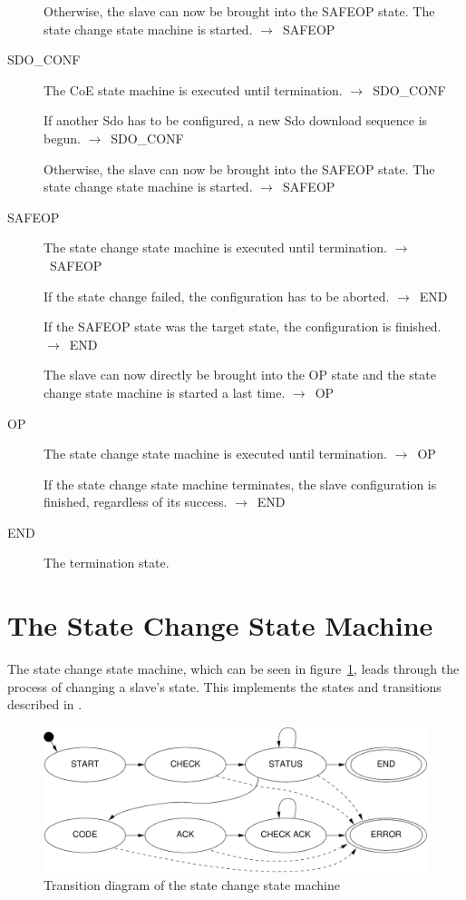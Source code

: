 \documentclass[a4paper,12pt,BCOR6mm,bibtotoc,idxtotoc]{scrbook}
\begin{document}
\begin{description}
  Otherwise, the slave can now be brought into the SAFEOP state. The
  state change state machine is started.
  $\rightarrow$~SAFEOP

\item[SDO\_CONF] The CoE state machine is executed until termination.
  $\rightarrow$~SDO\_CONF

  If another Sdo has to be configured, a new Sdo download sequence is
  begun. $\rightarrow$~SDO\_CONF

  Otherwise, the slave can now be brought into the SAFEOP state. The
  state change state machine is started.
  $\rightarrow$~SAFEOP

\item[SAFEOP] The state change state machine is executed until
  termination. $\rightarrow$~SAFEOP

  If the state change failed, the configuration has to be aborted.
  $\rightarrow$~END

  If the SAFEOP state was the target state, the configuration is
  finished. $\rightarrow$~END

  The slave can now directly be brought into the OP state and the
  state change state machine is started a last time.
  $\rightarrow$~OP

\item[OP] The state change state machine is executed until
  termination. $\rightarrow$~OP

  If the state change state machine terminates, the slave
  configuration is finished, regardless of its success.
  $\rightarrow$~END

\item[END] The termination state.

\end{description}


\section{The State Change State Machine}
\label{sec:fsm-change}

The state change state machine, which can be seen in
figure~\ref{fig:fsm-change}, leads through the process of changing a
slave's state. This implements the states and transitions described in
\cite[section~6.4.1]{alspec}.

\begin{figure}[htbp]
  \centering
  \includegraphics[width=.9\textwidth]{images/fsm-change}
  \caption{Transition diagram of the state change state machine}
  \label{fig:fsm-change}
\end{figure}
\end{document}

